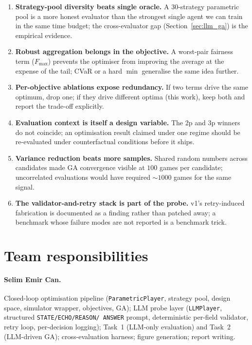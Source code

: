 \documentclass[10pt]{article}
\begin{document}
\begin{enumerate}[leftmargin=1.4em,itemsep=1pt]
\item \textbf{Strategy-pool diversity beats single oracle.} A
$30$-strategy parametric pool is a more honest evaluator than the
strongest single agent we can train in the same time budget; the
cross-evaluator gap (Section~\ref{sec:llm_ga}) is the empirical
evidence.
\item \textbf{Robust aggregation belongs in the objective.} A
worst-pair fairness term ($F_{\max}$) prevents the optimiser from
improving the average at the expense of the tail; CVaR or a hard
$\min$ generalise the same idea further.
\item \textbf{Per-objective ablations expose redundancy.} If two terms
drive the same optimum, drop one; if they drive different optima
(this work), keep both and report the trade-off explicitly.
\item \textbf{Evaluation context is itself a design variable.} The 2p
and 3p winners do not coincide; an optimisation result claimed under
one regime should be re-evaluated under counterfactual conditions
before it ships.
\item \textbf{Variance reduction beats more samples.} Shared random
numbers across candidates made GA convergence visible at $100$ games
per candidate; uncorrelated evaluations would have required
$\sim 1000$ games for the same signal.
\item \textbf{The validator-and-retry stack is part of the probe.}
v1's retry-induced fabrication is documented as a finding rather than
patched away; a benchmark whose failure modes are not reported is a
benchmark trick.
\end{enumerate}

\section{Team responsibilities}\label{sec:team}

\paragraph{Selim Emir Can.} %
Closed-loop optimisation pipeline (\texttt{ParametricPlayer}, strategy
pool, design space, simulator wrapper, objectives, GA); LLM probe
layer (\texttt{LLMPlayer}, structured \texttt{STATE/ECHO/REASON/
ANSWER} prompt, deterministic per-field validator, retry loop,
per-decision logging); Task~1 (LLM-only evaluation) and Task~2
(LLM-driven GA); cross-evaluation harness; figure generation; report
writing.
\end{document}
